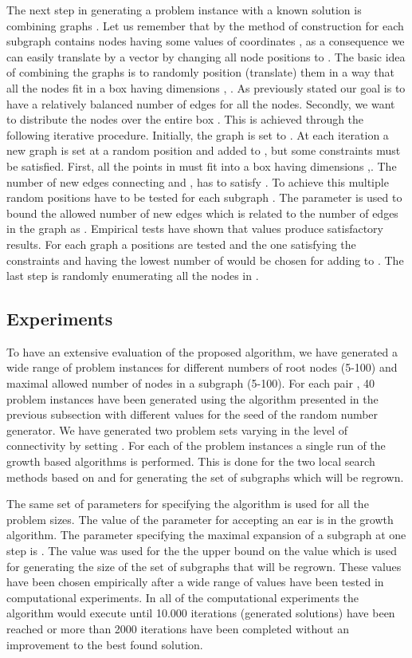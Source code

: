 The next step in generating a problem instance with a known solution is combining graphs . Let us remember that by the method of construction for each subgraph  contains  nodes having some values of coordinates , as a consequence we can easily translate  by a vector  by changing all node positions to . The basic idea of combining the graphs  is to randomly position (translate) them in a way that all the nodes fit in a box having dimensions , . As previously stated our goal is to have a relatively balanced number of edges for all the nodes. Secondly, we want to distribute the nodes over the entire box .  This is achieved through the following iterative procedure. Initially, the graph  is set to  . At each iteration a new graph  is set at a random position and added to , but some constraints must be satisfied. First, all the points in  must fit into a box having dimensions ,. The number of new edges  connecting  and , has to satisfy .  To achieve this multiple random positions  have to be tested for each subgraph . The parameter   is used to bound the allowed number of new edges which is related to the number of edges  in the graph as . Empirical tests have shown that values  produce satisfactory results. For each  graph  a  positions are tested and the one satisfying the constraints and having the lowest number of  would be chosen for adding to . The last step is randomly enumerating all the nodes in . 

\subsection{Experiments}




To have an extensive evaluation of the proposed algorithm, we have generated a wide range of problem instances for different numbers of root nodes  (5-100) and maximal allowed number of nodes in a subgraph  (5-100). For each pair ,  40 problem instances have been generated using the algorithm presented in the previous subsection with different values for the seed of the random number generator. We have generated two problem sets varying in the level of connectivity by setting .  For each of the problem instances a single run of the growth based algorithms is performed. This is done for the two local search methods based on  and  for generating the set of subgraphs  which will be regrown. 

The same set of parameters for specifying the algorithm is used for all the problem sizes. The value of the parameter for accepting an ear is  in the growth algorithm.  The parameter specifying the maximal expansion of a subgraph  at one step is .  The value  was used for the the upper bound on the value  which is used for generating the size  of the set of subgraphs that will be regrown. These values have been chosen empirically after a wide range of values have been tested in computational experiments. In all of the computational experiments the algorithm would execute until  10.000 iterations (generated solutions) have been reached  or  more than 2000 iterations have been completed without an improvement to the best found solution. 

